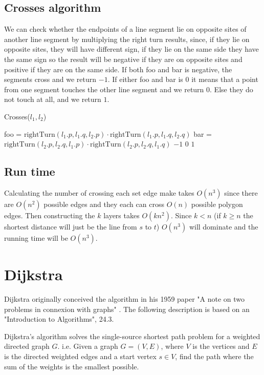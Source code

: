 \subsection{Crosses algorithm}
We can check whether the endpoints of a line segment lie on opposite sites of another
line segment by multiplying the right turn results, since, if they lie on opposite sites,
they will have different sign, if they lie on the same side they have the same
sign so the result will be negative if they are on opposite sites and positive
if they are on the same side. If both foo and bar is negative, the segments
cross and we return $-1$. If either foo and bar is $0$ it means that a point from
one segment touches the other line segment and we return $0$. Else they do not
touch at all, and we return $1$.
\begin{algorithm}[H]
	\caption{Crosses($l_1,l_2$)}
	\begin{algorithmic}[1] 
		\State foo = $\text{rightTurn}(l_1.p,l_1.q,l_2.p)\cdot
		\text{rightTurn}(l_1.p,l_1.q,l_2.q)$
		\State bar = $\text{rightTurn}(l_2.p,l_2.q,l_1.p)\cdot
		\text{rightTurn}(l_2.p,l_2.q,l_1.q)$
		\State \Return $-1$
		\State \Return $0$
		\Else
		\State \Return $1$
		\EndIf
	\end{algorithmic}
\end{algorithm}

\subsection{Run time}
Calculating the number of crossing each set edge make takes $O(n^3)$ since
there are $O(n^2)$ possible edges and they each can cross $O(n)$ possible
polygon edges. Then constructing the $k$ layers takes $O(k n^2)$. Since $k<n$
(if $k\geq n$ the shortest distance will just be the line from $s$ to $t$)
$O(n^3)$ will dominate and the running time will be $O(n^3)$.

\section{Dijkstra}

Dijkstra originally conceived the algorithm in his 1959 paper "A note on two
problems in connexion with graphs" \cite{dijkstra59}.  The following
description is based on an "Introduction to Algorithms"\cite{IntroToAlg}, 24.3.

Dijkstra's algorithm solves the single-source shortest path problem for a
weighted directed graph $G$. i.e. Given a graph $G=(V,E)$, where $V$ is the
vertices and $E$ is the directed weighted edges and a start vertex $s\in V$,
find the path where the sum of the weights is the smallest possible.

